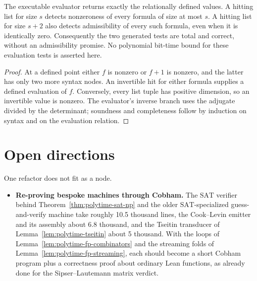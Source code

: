 \begin{theorem}
  \label{thm:rational-finite-tests}
  \leanok
  The executable evaluator returns exactly the relationally defined values.
  A hitting list for size $s$ detects nonzeroness of every formula of size
  at most $s$. A hitting list for size $s+2$ also detects admissibility of
  every such formula, even when it is identically zero. Consequently the
  two generated tests are total and correct, without an admissibility promise.
  No polynomial bit-time bound for these evaluation tests is asserted here.
\end{theorem}
\begin{proof}
  \leanok
  At a defined point either $f$ is nonzero or $f+1$ is nonzero, and the latter
  has only two more syntax nodes. An invertible hit for either formula supplies
  a defined evaluation of $f$. Conversely, every list tuple has positive
  dimension, so an invertible value is nonzero. The evaluator's inverse
  branch uses the adjugate divided by the determinant; soundness and
  completeness follow by induction on syntax and on the evaluation relation.
\end{proof}

\section{Open directions}

One refactor does not fit as a node.

\begin{itemize}
  \item \textbf{Re-proving bespoke machines through Cobham.} The
    $\mathrm{SAT}$ verifier behind Theorem~\ref{thm:polytime-sat-np} and the
    older $\mathrm{SAT}$-specialized guess-and-verify machine take roughly
    10.5 thousand lines, the
    Cook--Levin emitter and its assembly about 6.8 thousand, and the Tseitin
    transducer of Lemma~\ref{lem:polytime-tseitin} about 5 thousand. With the
    loops of Lemma~\ref{lem:polytime-fp-combinators} and the streaming folds of
    Lemma~\ref{lem:polytime-fp-streaming}, each should become
    a short Cobham program plus a correctness proof about ordinary Lean
    functions, as already done for the Sipser--Lautemann matrix verdict.
\end{itemize}
